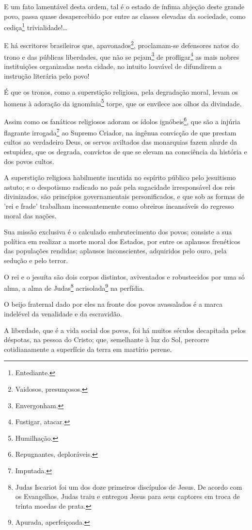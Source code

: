 E um fato lamentável desta ordem, tal é o estado de ínfima abjeção deste
grande povo, passa quase desapercebido por entre as classes elevadas da
sociedade, como cediça\footnote{Entediante.} trivialidade!\ldots

E há escritores brasileiros que, apavonados\footnote{Vaidosos,
  presunçosos.}, proclamam-se defensores natos do trono e das públicas
liberdades, que não se pejam\footnote{Envergonham.} de
profligar\footnote{Fustigar, atacar.} as mais nobres instituições
organizadas nesta cidade, no intuito louvável de difundirem a instrução
literária pelo povo!

É que os tronos, como a superstição religiosa, pela degradação moral,
levam os homens à adoração da ignomínia\footnote{Humilhação.} torpe,
que os envilece aos olhos da divindade.

Assim como os fanáticos religiosos adoram os ídolos ignóbeis\footnote{
  Repugnantes, deploráveis.}, que são a injúria flagrante
irrogada\footnote{Imputada.} ao Supremo Criador, na ingênua convicção
de que prestam cultos ao verdadeiro Deus, os servos aviltados das
monarquias fazem alarde da estupidez, que os degrada, convictos de que
se elevam na consciência da história e dos povos cultos.

A superstição religiosa habilmente incutida no espírito público pelo
jesuitismo astuto; e o despotismo radicado no país pela sagacidade
irresponsável dos reis divinizados, são princípios governamentais
personificados, e que sob as formas de 'rei e frade' trabalham
incessantemente como obreiros incansáveis do regresso moral das nações.

Sua missão exclusiva é o calculado embrutecimento dos povos; consiste a
sua política em realizar a morte moral dos Estados, por entre os
aplausos frenéticos das populações rendidas; aplausos inconscientes,
adquiridos pelo ouro, pela sedução e pelo terror.

O rei e o jesuíta são dois corpos distintos, aviventados e robustecidos
por uma só alma, a alma de Judas\footnote{Judas Iscariot foi um dos
  doze primeiros discípulos de Jesus. De acordo com os Evangelhos, Judas
  traiu e entregou Jesus para seus captores em troca de trinta moedas de
  prata.\label{judas}} acrisolada\footnote{Apurada, aperfeiçoada.} na perfídia.

O beijo fraternal dado por eles na fronte dos povos avassalados é a
marca indelével da venalidade e da escravidão.

A liberdade, que é a vida social dos povos, foi há muitos séculos
decapitada pelos déspotas, na pessoa do Cristo; que, semelhante à luz do
Sol, percorre cotidianamente a superfície da terra em martírio perene.

